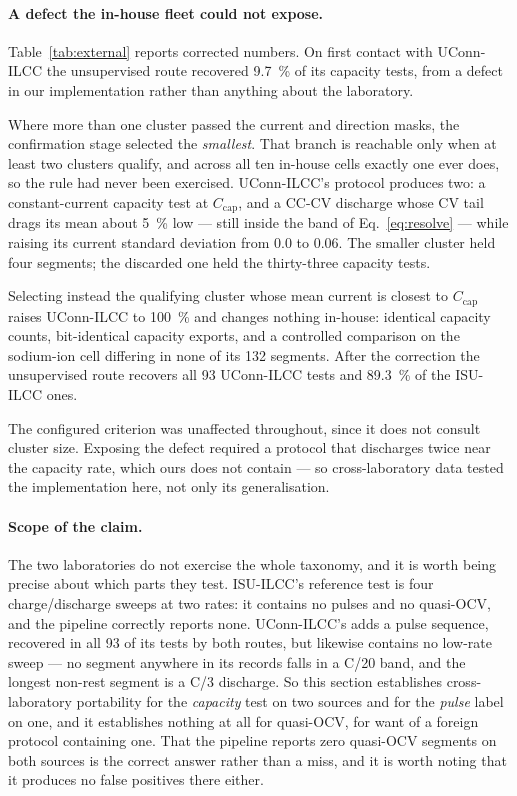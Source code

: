 \documentclass[preprint,3p,number]{elsarticle}
\begin{document}
\paragraph{A defect the in-house fleet could not expose.} Table~\ref{tab:external}
reports corrected numbers. On first contact with UConn-ILCC the unsupervised
route recovered \SI{9.7}{\percent} of its capacity tests, from a defect in our
implementation rather than anything about the laboratory.

Where more than one cluster passed the current and direction masks, the
confirmation stage selected the \emph{smallest}. That branch is reachable only
when at least two clusters qualify, and across all ten in-house cells exactly
one ever does, so the rule had never been exercised. UConn-ILCC's protocol
produces two: a constant-current capacity test at $C_{\mathrm{cap}}$, and a
CC-CV discharge whose CV tail drags its mean about \SI{5}{\percent} low --- still
inside the band of Eq.~\eqref{eq:resolve} --- while raising its current standard
deviation from \num{0.0} to \num{0.06}. The smaller cluster held four segments;
the discarded one held the thirty-three capacity tests.

Selecting instead the qualifying cluster whose mean current is closest to
$C_{\mathrm{cap}}$ raises UConn-ILCC to \SI{100}{\percent} and changes nothing
in-house: identical capacity counts, bit-identical capacity exports, and a
controlled comparison on the sodium-ion cell differing in none of its \num{132}
segments. After the correction the unsupervised route recovers all \num{93}
UConn-ILCC tests and \SI{89.3}{\percent} of the ISU-ILCC ones.

The configured criterion was unaffected throughout, since it does not consult
cluster size. Exposing the defect required a protocol that discharges twice near
the capacity rate, which ours does not contain --- so cross-laboratory data
tested the implementation here, not only its generalisation.
\paragraph{Scope of the claim.} The two laboratories do not exercise the whole
taxonomy, and it is worth being precise about which parts they test. ISU-ILCC's
reference test is four charge/discharge sweeps at two rates: it contains no
pulses and no quasi-OCV, and the pipeline correctly reports none. UConn-ILCC's
adds a pulse sequence, recovered in all \num{93} of its tests by both routes,
but likewise contains no low-rate sweep --- no segment anywhere in its records
falls in a C/20 band, and the longest non-rest segment is a C/3 discharge. So
this section establishes cross-laboratory portability for the \emph{capacity}
test on two sources and for the \emph{pulse} label on one, and it establishes
nothing at all for quasi-OCV, for want of a foreign protocol containing one.
That the pipeline reports zero quasi-OCV segments on both sources is the correct
answer rather than a miss, and it is worth noting that it produces no false
positives there either.
\end{document}
